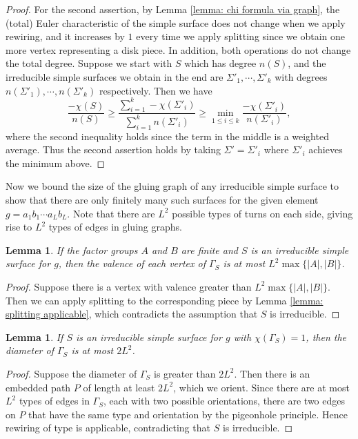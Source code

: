 \documentclass{amsart}
\newtheorem{lemma}[theorem]{Lemma}
\theoremstyle{definition}
\numberwithin{equation}{section}
\theoremstyle{theorem}
\theoremstyle{remark}
\newcommand{\RNum}[1]{\uppercase\expandafter{\romannumeral #1\relax}}
\begin{document}
\begin{proof}
		For the second assertion, by Lemma \ref{lemma: chi formula via graph}, the (total) Euler characteristic of the simple surface does not change when we apply rewiring, and it increases by $1$ every time we apply splitting since we obtain one more vertex representing a disk piece.
		In addition, both operations do not change the total degree.
		Suppose we start with $S$ which has degree $n(S)$, and the irreducible simple surfaces we obtain in the end are $\Sigma'_1,\cdots, \Sigma'_k$ with degrees $n(\Sigma'_1),\cdots,n(\Sigma'_k)$ respectively. Then we have
		$$\frac{-\chi(S)}{n(S)}\ge \frac{\sum_{i=1}^k -\chi(\Sigma'_i)}{\sum_{i=1}^k n(\Sigma'_i)}\ge\min_{1\le i\le k}\frac{-\chi(\Sigma'_i)}{n(\Sigma'_i)},$$
		where the second inequality holds since the term in the middle is a weighted average. Thus the second assertion holds by taking $\Sigma'=\Sigma'_i$  where $\Sigma'_i$ achieves the minimum above.
	\end{proof}
	
	Now we bound the size of the gluing graph of any irreducible simple surface to show that there are only finitely many such surfaces for the given element $g=a_1b_1\cdots a_L b_L$. Note that there are $L^2$ possible types of turns on each side, giving rise to $L^2$ types of edges in gluing graphs.
	\begin{lemma}\label{lemma: valence bound}
		If the factor groups $A$ and $B$ are finite and $S$ is an irreducible simple surface for $g$, then the valence of each vertex of $\Gamma_S$ is at most $L^2\max\{|A|,|B|\}$.
	\end{lemma}
	\begin{proof}
		Suppose there is a vertex with valence greater than $L^2\max\{|A|,|B|\}$. Then we can apply splitting to the corresponding piece by Lemma \ref{lemma: splitting applicable}, which contradicts the assumption that $S$ is irreducible.
	\end{proof}
	
	\begin{lemma}\label{lemma: diameter bound for trees}
		If $S$ is an irreducible simple surface for $g$ with $\chi(\Gamma_S)=1$, then the diameter of $\Gamma_S$ is at most $2L^2$.
	\end{lemma}
	\begin{proof}
		Suppose the diameter of $\Gamma_S$ is greater than $2L^2$. Then there is an embedded path $P$ of length at least $2L^2$, which we orient. Since there are at most $L^2$ types of edges in $\Gamma_S$, each with two possible orientations, there are two edges on $P$ that have the same type and orientation by the pigeonhole principle. Hence rewiring of type \RNum{1} is applicable, contradicting that $S$ is irreducible.
	\end{proof}
	
\end{document}
